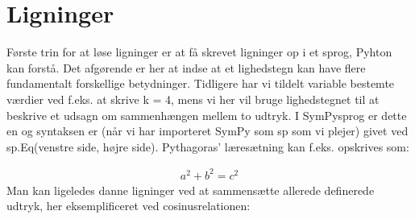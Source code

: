 \documentclass[letterpaper,10pt,english]{jupyterBook}
\begin{document}
\section{Ligninger}
\label{\detokenize{notebooks/sympy/Notebook3_ligninger:ligninger}}\label{\detokenize{notebooks/sympy/Notebook3_ligninger::doc}}
Første trin for at løse ligninger er at få skrevet ligninger op i et sprog, Pyhton kan forstå. Det afgørende er her at indse at et lighedstegn kan have flere fundamentalt forskellige betydninger. Tidligere har vi tildelt variable bestemte værdier ved f.eks. at skrive k = 4, mens vi her vil bruge lighedstegnet til at beskrive et udsagn om sammenhængen mellem to udtryk. I SymPy\sphinxhyphen{}sprog er dette en  og syntaksen er (når vi har importeret SymPy som sp som vi plejer) givet ved sp.Eq(venstre side, højre side). Pythagoras’ læresætning kan f.eks. opskrives som:

\begin{sphinxVerbatim}[commandchars=\\\{\}]
   
                  

               
\end{sphinxVerbatim}
\begin{equation*}
\begin{split}\displaystyle a^{2} + b^{2} = c^{2}\end{split}
\end{equation*}
Man kan ligeledes danne ligninger ved at sammensætte allerede definerede udtryk, her eksemplificeret ved cosinusrelationen:
\end{document}
